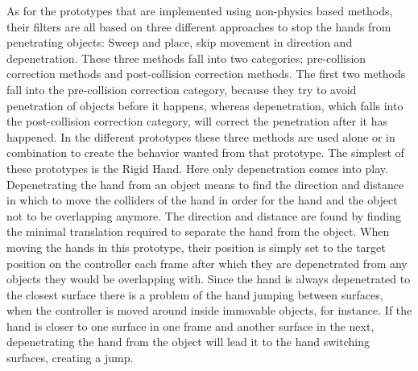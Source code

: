 As for the prototypes that are implemented using non-physics based methods, their filters are all based on three different approaches to stop the hands from penetrating objects: Sweep and place, skip movement in direction and depenetration. These three methods fall into two categories; pre-collision correction methods and post-collision correction methods. The first two methods fall into the pre-collision correction category, because they try to avoid penetration of objects before it happens, whereas depenetration, which falls into the post-collision correction category, will correct the penetration after it has happened. In the different prototypes these three methods are used alone or in combination to create the behavior wanted from that prototype. The simplest of these prototypes is the Rigid Hand. Here only depenetration comes into play. Depenetrating the hand from an object means to find the direction and distance in which to move the colliders of the hand in order for the hand and the object not to be overlapping anymore. The direction and distance are found by finding the minimal translation required to separate the hand from the object. When moving the hands in this prototype, their position is simply set to the target position on the controller each frame after which they are depenetrated from any objects they would be overlapping with. Since the hand is always depenetrated to the closest surface there is a problem of the hand jumping between surfaces, when the controller is moved around inside immovable objects, for instance. If the hand is closer to one surface in one frame and another surface in the next, depenetrating the hand from the object will lead it to the hand switching surfaces, creating a jump.

